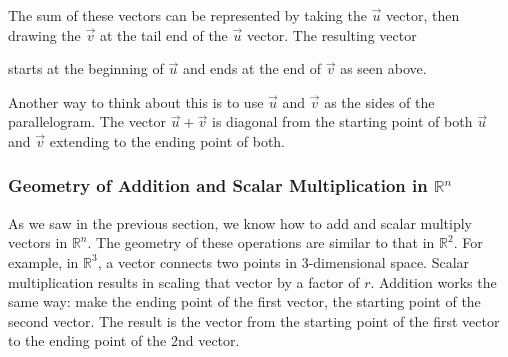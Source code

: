 \begin{center}
\end{center}
The sum of these vectors can be represented by taking the $\vec{u}$ vector, then drawing the $\vec{v}$ at the tail end of the $\vec{u}$ vector.  The resulting vector 
\begin{center}
\end{center}
starts at the beginning of $\vec{u}$ and ends at the end of $\vec{v}$ as seen above.  

Another way to think about this is to use $\vec{u}$ and $\vec{v}$ as the sides of the parallelogram.  The vector $\vec{u}+\vec{v}$ is diagonal from the starting point of both $\vec{u}$ and $\vec{v}$ extending to the ending point of both.  
\begin{center}
\end{center}

\subsubsection{Geometry of Addition and Scalar Multiplication in $\mathbb{R}^n$}

As we saw in the previous section, we know how to add and scalar multiply vectors in $\mathbb{R}^n$.  The geometry of these operations are similar to that in $\mathbb{R}^2$.  For example, in $\mathbb{R}^3$, a vector connects two points in 3-dimensional space.  Scalar multiplication results in scaling that vector by a factor of $r$.  Addition works the same way: make the ending point of the first vector, the starting point of the second vector.  The result is the vector from the starting point of the first vector to the ending point of the 2nd vector.  

